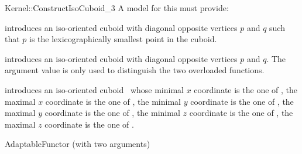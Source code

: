 \begin{ccRefFunctionObjectConcept}{Kernel::ConstructIsoCuboid_3}
A model for this must provide:


            {introduces an iso-oriented cuboid  with diagonal
             opposite vertices $p$ and $q$ such that $p$ is the
             lexicographically smallest point in the cuboid.}

            {introduces an iso-oriented cuboid with diagonal
             opposite vertices $p$ and $q$.  The  argument value is
             only used to distinguish the two overloaded functions.
             }

            {introduces an iso-oriented cuboid \ccVar\ whose
             minimal $x$ coordinate is the one of , the
             maximal $x$ coordinate is the one of , the
             minimal $y$ coordinate is the one of , the
             maximal $y$ coordinate is the one of , the
             minimal $z$ coordinate is the one of , the
             maximal $z$ coordinate is the one of .}

\ccRefines
AdaptableFunctor (with two arguments)

\ccSeeAlso
{}  \\

\end{ccRefFunctionObjectConcept}

